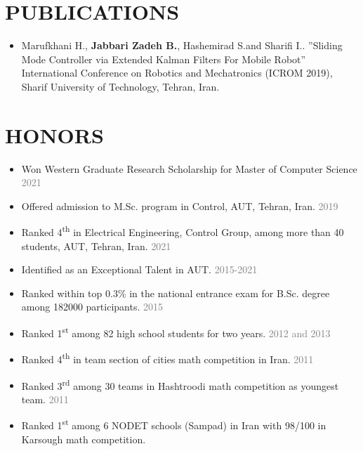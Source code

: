 \documentclass[10pt,a4paper,sans]{moderncv} %
\begin{document}
	\section{PUBLICATIONS}
        \begin{itemize}
            \item Marufkhani H., \textbf{Jabbari Zadeh B.}, Hashemirad S.and Sharifi I.. ”Sliding Mode Controller via Extended
    Kalman Filters For Mobile Robot” International Conference on Robotics and Mechatronics (ICROM
    2019), Sharif University of Technology, Tehran, Iran.
        \end{itemize}
	
	\section{HONORS}	
        \begin{itemize}
            \item Won Western Graduate Research Scholarship for Master of Computer Science \hfill \textcolor{gray}{2021}
            
            \item Offered admission to M.Sc. program in Control, AUT, Tehran, Iran. \hfill \textcolor{gray}{2019} 
                
            \item Ranked 4\textsuperscript{th} in Electrical Engineering, Control Group, among more than 40 students,
            AUT, Tehran, Iran. \hfill \textcolor{gray}{2021}

            \item Identified as an Exceptional Talent in AUT. \hfill \textcolor{gray}{2015-2021}
            
            \item Ranked within top 0.3\% in the national entrance exam for B.Sc. degree among 182000 participants. \hfill \textcolor{gray}{2015}
            
            \item Ranked 1\textsuperscript{st} among 82 high school students for two years. \hfill \textcolor{gray}{2012 and 2013}

            \item Ranked 4\textsuperscript{th} in team section of cities math competition  in Iran. \hfill \textcolor{gray}{2011}	

            \item Ranked 3\textsuperscript{rd} among 30 teams in Hashtroodi math competition  as youngest team. \hfill \textcolor{gray}{2011}		

            \item Ranked 1\textsuperscript{st} among 6 NODET schools (Sampad) in Iran with 98/100 in Karsough math competition.

        \end{itemize}
\end{document}
